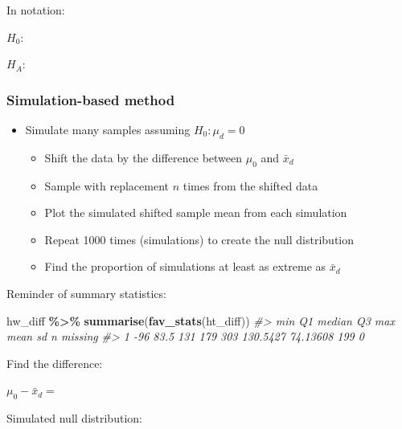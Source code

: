 \documentclass[
]{report}
\newenvironment{Shaded}{\begin{snugshade}}{\end{snugshade}}
\newcommand{\CommentTok}[1]{\textcolor[rgb]{0.56,0.35,0.01}{\textit{#1}}}
\newcommand{\FunctionTok}[1]{\textcolor[rgb]{0.13,0.29,0.53}{\textbf{#1}}}
\newcommand{\NormalTok}[1]{#1}
\newcommand{\SpecialCharTok}[1]{\textcolor[rgb]{0.81,0.36,0.00}{\textbf{#1}}}
\begin{document}
In notation:

\(H_0:\)

\vspace{0.2in}

\(H_A:\)

\vspace{0.2in}

\hypertarget{simulation-based-method-5}{%
\subsubsection*{Simulation-based method}\label{simulation-based-method-5}}

\begin{itemize}
\item
  Simulate many samples assuming \(H_0: \mu_d = 0\)

  \begin{itemize}
  \item
    Shift the data by the difference between \(\mu_0\) and \(\bar{x}_d\)
  \item
    Sample with replacement \(n\) times from the shifted data
  \item
    Plot the simulated shifted sample mean from each simulation
  \item
    Repeat 1000 times (simulations) to create the null distribution
  \item
    Find the proportion of simulations at least as extreme as \(\bar{x}_d\)
  \end{itemize}
\end{itemize}

Reminder of summary statistics:

\begin{Shaded}
\begin{Highlighting}[]
\NormalTok{hw\_diff }\SpecialCharTok{\%\textgreater{}\%}
    \FunctionTok{summarise}\NormalTok{(}\FunctionTok{fav\_stats}\NormalTok{(ht\_diff))}
\CommentTok{\#\textgreater{}   min   Q1 median  Q3 max     mean       sd   n missing}
\CommentTok{\#\textgreater{} 1 {-}96 83.5    131 179 303 130.5427 74.13608 199       0}
\end{Highlighting}
\end{Shaded}

Find the difference:

\(\mu_0 - \bar{x}_d =\)

Simulated null distribution:
\end{document}
